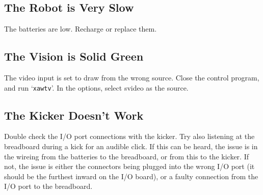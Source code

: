 \documentclass[a4paper,12pt]{scrartcl}
\begin{document}
\subsection{The Robot is Very Slow}

The batteries are low. Recharge or replace them.

\subsection{The Vision is Solid Green}

The video input is set to draw from the wrong source. Close the control
program, and run `\texttt{xawtv}'. In the options, select svideo as the source.

\subsection{The Kicker Doesn't Work}

Double check the I/O port connections with the kicker. Try also listening at
the breadboard during a kick for an audible click. If this can be heard, the
issue is in the wireing from the batteries to the breadboard, or from this to
the kicker. If not, the issue is either the connectors being plugged into the
wrong I/O port (it should be the furthest inward on the I/O board), or a faulty
connection from the I/O port to the breadboard.
\end{document}
